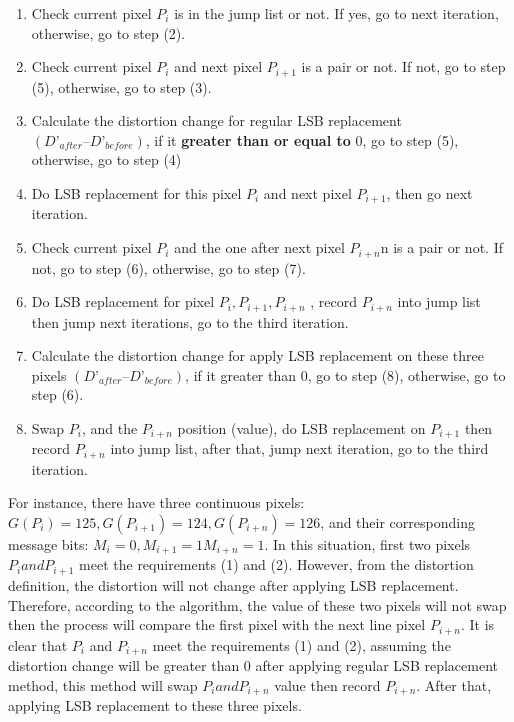 \documentclass[%
    reprint,
    amsmath,amssymb,
    aps,
   ]{revtex4-1}
\begin{document}
   \begin{enumerate}
   \item Check current pixel \(P_{i}\) is in the jump list or not. If yes, go to next iteration, otherwise, go to step (2).
   \item Check current pixel \(P_{i}\) and next pixel \(P_{i+1}\) is a pair or not. If not, go to step (5), otherwise, go to step (3).
   \item Calculate the distortion change for regular LSB replacement \((D’_{after} – D’_{before})\), if it \textbf{greater than or equal to} 0, go to step (5), otherwise, go to step (4)
   \item Do LSB replacement for this pixel \(P_{i}\) and next pixel \(P_{i+1}\), then go next iteration.
   \item Check current pixel \(P_{i}\) and the one after next pixel \(P_{i+n}\)n is a pair or not. If not, go to step (6), otherwise, go to step (7).
   \item Do LSB replacement for pixel \(P_{i}, P_{i+1}, P_{i+n}\) , record \(P_{i+n}\) into jump list then jump next iterations, go to the third iteration.
   \item Calculate the distortion change for apply LSB replacement on these three pixels \((D’_{after} – D’_{before})\), if it greater than 0, go to step (8), otherwise, go to step (6).
   \item Swap \(P_{i}\), and the \(P_{i+n}\) position (value), do LSB replacement on \(P_{i+1}\) then record \(P_{i+n}\) into jump list, after that, jump next iteration, go to the third iteration.
   \end{enumerate}
   
   For instance, there have three continuous pixels: \(G(P_{i}) = 125, G(P_{i+1}) = 124, G(P_{i+n}) = 126\), and their corresponding message bits: \(M_{i} = 0, M_{i+1} = 1 M_{i+n} = 1\). In this situation, first two pixels \(P_{i} and P_{i+1}\) meet the requirements (1) and (2). However, from the distortion definition, the distortion will not change after applying LSB replacement. Therefore, according to the algorithm, the value of these two pixels will not swap then the process will compare the first pixel with the next line pixel \(P_{i+n}\). It is clear that \(P_{i}\) and \(P_{i+n}\) meet the requirements (1) and (2), assuming the distortion change will be greater than 0 after applying regular LSB replacement method, this method will swap \(P_{i} and P_{i+n}\) value then record \(P_{i+n}\). After that, applying LSB replacement to these three pixels.
   
\end{document}
